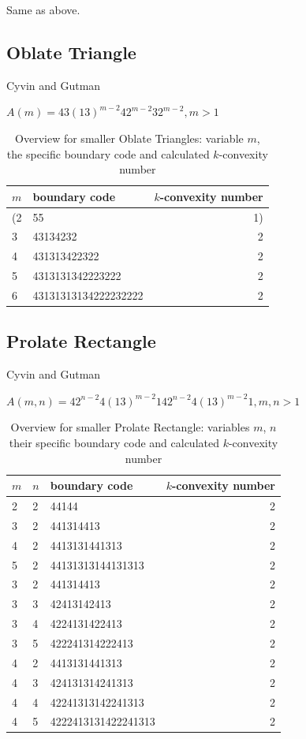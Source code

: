 \documentclass[a4paper,10pt]{article}
\begin{document}
{Same as above.

\subsection{Oblate Triangle}

Cyvin and Gutman~\cite[p.~197]{cyvin_1988}

\cite{cyvin_2013}


$A(m) = 43(13)^{m-2}42^{m-2}32^{m-2}, m>1$

\begin{table}
 \caption{Overview for smaller Oblate Triangles: variable $m$, the specific boundary code and calculated $k$-convexity number}
 \medskip
 \begin{tabular}{|l l r|}
 \hline
  $m$ & boundary code & $k$-convexity number\\
  \hline
  (2 & 55 & 1) \\
  3 & 43134232 & 2 \\
  4 & 431313422322 & 2 \\
  5 & 4313131342223222 & 2 \\
  6 & 43131313134222232222 & 2 \\
  \hline
 \end{tabular}
\end{table}


\subsection{Prolate Rectangle}

Cyvin and Gutman~\cite[p.~201]{cyvin_1988}


\cite{cyvin_2013}
\cite{yen_1971}

$A(m,n) = 42^{n-2}4(13)^{m-2}142^{n-2}4(13)^{m-2}1, m,n>1$

\begin{table}
 \caption{Overview for smaller Prolate Rectangle: variables $m$, $n$ their specific boundary code and calculated $k$-convexity number}
 \medskip
 \begin{tabular}{|l l l r|}
 \hline
  $m$ & $n$ & boundary code & $k$-convexity number\\
  \hline
  2 & 2 & 44144 & 2 \\
  3 & 2 & 441314413 & 2 \\
  4 & 2 & 4413131441313 & 2 \\
  5 & 2 & 44131313144131313 & 2 \\
  \hline
  3 & 2 & 441314413 & 2 \\
  3 & 3 & 42413142413 & 2 \\
  3 & 4 & 4224131422413 & 2 \\
  3 & 5 & 422241314222413 & 2 \\
  \hline
  4 & 2 & 4413131441313 & 2 \\
  4 & 3 & 424131314241313 & 2 \\
  4 & 4 & 42241313142241313 & 2 \\
  4 & 5 & 4222413131422241313 & 2 \\
  \hline
 \end{tabular}
\end{table}

}
\end{document}
